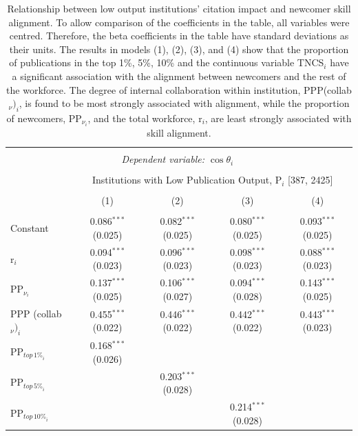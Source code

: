 \documentclass[draft,final]{vutinfth} %
\begin{document}
\begin{table}[!htbp] \centering 
  \caption{Relationship between low output institutions' citation impact and newcomer skill alignment. To allow comparison of the coefficients in the table, all variables were centred. Therefore, the beta coefficients in the table have standard deviations as their units. The results in models (1), (2), (3), and (4) show that the proportion of publications in the top 1\%, 5\%, 10\% and the continuous variable TNCS$_{i}$ have a significant association with the alignment between newcomers and the rest of the workforce. The degree of internal collaboration within institution, PPP(collab$_{\nu})_{i}$, is found to be most strongly associated with alignment, while the proportion of newcomers, PP$_{\nu_i}$, and the total workforce, r$_{i}$, are least strongly associated with skill alignment.}
  \label{Table S2} 
\small 
\scriptsize
\begin{tabularx}{\textwidth}{@{\extracolsep{\fill}}lcccc}
\\[-1.8ex]\hline 
\hline \\[-1.8ex] 
 & \multicolumn{3}{c}{\textit{Dependent variable: $\cos{\theta}_{i}$}} \\ 
\cline{2-5} 
\\[-1.8ex] & \multicolumn{4}{c}{Institutions with Low Publication Output, P$_{i}$ [387, 2425]} \\ 
\\[-1.8ex] & (1) & (2) & (3) & (4)\\ 
\hline \\[-1.8ex] 
 Constant & 0.086$^{***}$ (0.025) & 0.082$^{***}$ (0.025) & 0.080$^{***}$ (0.025) & 0.093$^{***}$ (0.025) \\ 
  r$_{i}$ & 0.094$^{***}$ (0.023) & 0.096$^{***}$ (0.023) & 0.098$^{***}$ (0.023) & 0.088$^{***}$ (0.023) \\ 
  PP$_{\nu_i}$ & 0.137$^{***}$ (0.025) & 0.106$^{***}$ (0.027) & 0.094$^{***}$ (0.028) & 0.143$^{***}$ (0.025) \\ 
  PPP (collab$_\nu)_{i}$ & 0.455$^{***}$ (0.022) & 0.446$^{***}$ (0.022) & 0.442$^{***}$ (0.022) & 0.443$^{***}$ (0.023) \\ 
  PP$_{{top\,1\%}_{i}}$ & 0.168$^{***}$ (0.026) &  &  &  \\ 
  PP$_{{top\,5\%}_{i}}$ &  & 0.203$^{***}$ (0.028) &  &  \\ 
  PP$_{{top\,10\%}_{i}}$ &  &  & 0.214$^{***}$ (0.028) &  \\ 

\end{tabularx}
\end{table}
\end{document}
